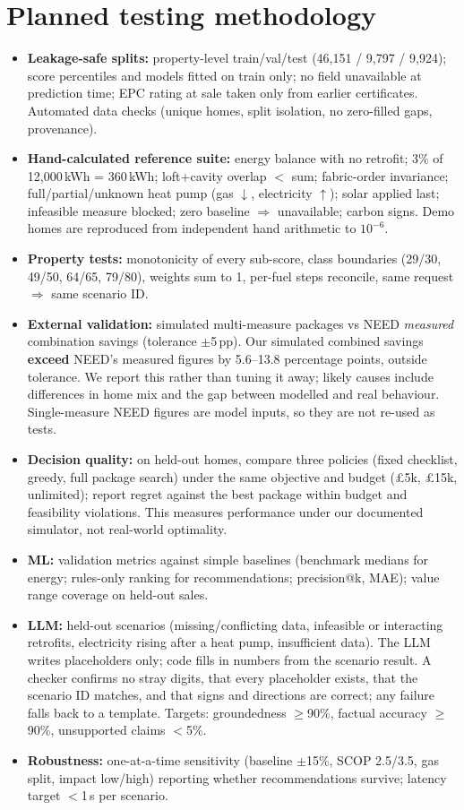 \documentclass[10pt,a4paper]{article}
\begin{document}
\section{Planned testing methodology}
\begin{itemize}
\item \textbf{Leakage-safe splits:} property-level train/val/test (46,151 / 9,797 / 9,924); score percentiles and
models fitted on train only; no field unavailable at prediction time; EPC rating at sale taken only from earlier
certificates. Automated data checks (unique homes, split isolation, no zero-filled gaps, provenance).
\item \textbf{Hand-calculated reference suite:} energy balance with no retrofit; 3\% of 12,000\,kWh = 360\,kWh; loft+cavity
overlap $<$ sum; fabric-order invariance; full/partial/unknown heat pump (gas $\downarrow$, electricity $\uparrow$);
solar applied last; infeasible measure blocked; zero baseline $\Rightarrow$ unavailable; carbon signs. Demo homes are
reproduced from independent hand arithmetic to $10^{-6}$.
\item \textbf{Property tests:} monotonicity of every sub-score, class boundaries (29/30, 49/50, 64/65, 79/80), weights
sum to 1, per-fuel steps reconcile, same request $\Rightarrow$ same scenario ID.
\item \textbf{External validation:} simulated multi-measure packages vs NEED \emph{measured} combination savings
(tolerance $\pm$5\,pp). Our simulated combined savings \textbf{exceed} NEED's measured figures by 5.6--13.8 percentage
points, outside tolerance. We report this rather than tuning it away; likely causes include differences in home mix and
the gap between modelled and real behaviour. Single-measure NEED figures are model inputs, so they are not re-used as tests.
\item \textbf{Decision quality:} on held-out homes, compare three policies (fixed checklist, greedy, full package search)
under the same objective and budget (\pounds5k, \pounds15k, unlimited); report regret against the best package within
budget and feasibility violations. This measures performance under our documented simulator, not real-world optimality.
\item \textbf{ML:} validation metrics against simple baselines (benchmark medians for energy; rules-only ranking for
recommendations; precision@k, MAE); value range coverage on held-out sales.
\item \textbf{LLM:} held-out scenarios (missing/conflicting data, infeasible or interacting retrofits, electricity rising
after a heat pump, insufficient data). The LLM writes placeholders only; code fills in numbers from the scenario result.
A checker confirms no stray digits, that every placeholder exists, that the scenario ID matches, and that signs and
directions are correct; any failure falls back to a template. Targets: groundedness $\ge$90\%, factual accuracy $\ge$90\%, unsupported claims $<$5\%.
\item \textbf{Robustness:} one-at-a-time sensitivity (baseline $\pm$15\%, SCOP 2.5/3.5, gas split, impact low/high)
reporting whether recommendations survive; latency target $<$1\,s per scenario.
\end{itemize}
\end{document}
